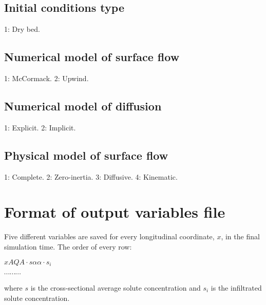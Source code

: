 \documentclass[a4paper,12pt]{report}
\begin{document}
\subsection{Initial conditions type}
\begin{verbatimtab}[4]
		1: Dry bed.
\end{verbatimtab}

\subsection{Numerical model of surface flow}
\begin{verbatimtab}
	1: McCormack.
	2: Upwind.
\end{verbatimtab}

\subsection{Numerical model of diffusion}
\begin{verbatimtab}
	1: Explicit.
	2: Implicit.
\end{verbatimtab}

\subsection{Physical model of surface flow}
\begin{verbatimtab}
	1: Complete.
	2: Zero-inertia.
	3: Diffusive.
	4: Kinematic.
\end{verbatimtab}

\section{Format of output variables file}
Five different variables are saved for every longitudinal coordinate, $x$, in the final simulation time. 
The order of every row:

\hspace{1.8cm}$x$\hspace{0.9cm}$A$\hspace{0.9cm}$Q$\hspace{0.9cm}$A\cdot s$\hspace{0.9cm}$\alpha$\hspace{0.9cm}$\alpha\cdot s_i$ 

\hspace{3.8cm} $\cdots \cdots \cdots$

\noindent where $s$ is the cross-sectional average solute concentration and $s_i$ is the infiltrated solute concentration.
\end{document}
